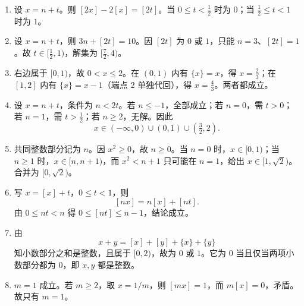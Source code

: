 \documentclass[11pt,a4paper,fontset=fandol]{ctexart}
\begin{document}
\begin{enumerate}
\item\begin{testsolution}设 $x=n+t$。则 $[2x]-2[x]=[2t]$。当 $0\le t<\frac12$ 时为 $0$；当 $\frac12\le t<1$ 时为 $1$。\end{testsolution}
\item\begin{testsolution}设 $x=n+t$，则 $3n+[2t]=10$。因 $[2t]$ 为 $0$ 或 $1$，只能 $n=3$、$[2t]=1$。故 $t\in[\frac12,1)$，解集为 $[\frac72,4)$。\end{testsolution}
\item\begin{testsolution}右边属于 $[0,1)$，故 $0<x\le2$。在 $(0,1)$ 内有 $\{x\}=x$，得 $x=\frac23$；在 $[1,2]$ 内有 $\{x\}=x-1$（端点 $2$ 单独代回），得 $x=\frac43$。两者都成立。\end{testsolution}
\item\begin{testsolution}设 $x=n+t$，条件为 $n<2t$。若 $n\le-1$，全部成立；若 $n=0$，需 $t>0$；若 $n=1$，需 $t>\frac12$；若 $n\ge2$，无解。因此
\[
x\in(-\infty,0)\cup(0,1)\cup(\tfrac32,2).
\]\end{testsolution}
\item\begin{testsolution}共同整数部分记为 $n$。因 $x^2\ge0$，故 $n\ge0$。当 $n=0$ 时，$x\in[0,1)$；当 $n\ge1$ 时，$x\in[n,n+1)$，而 $x^2<n+1$ 只可能在 $n=1$，给出 $x\in[1,\sqrt2)$。合并为 $[0,\sqrt2)$。\end{testsolution}
\item\begin{testsolution}写 $x=[x]+t$，$0\le t<1$，则
\[
[nx]=n[x]+[nt].
\]
由 $0\le nt<n$ 得 $0\le[nt]\le n-1$，结论成立。\end{testsolution}
\item\begin{testsolution}由
\[
x+y=[x]+[y]+\{x\}+\{y\}
\]
知小数部分之和是整数，且属于 $[0,2)$，故为 $0$ 或 $1$。它为 $0$ 当且仅当两项小数部分都为 $0$，即 $x,y$ 都是整数。\end{testsolution}
\item\begin{testsolution}$m=1$ 成立。若 $m\ge2$，取 $x=1/m$，则 $[mx]=1$，而 $m[x]=0$，矛盾。故只有 $m=1$。\end{testsolution}
\end{enumerate}
\end{document}
